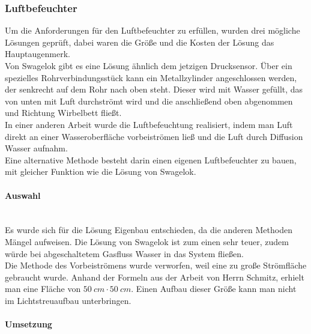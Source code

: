 \subsubsection{Luftbefeuchter}

Um die Anforderungen für den Luftbefeuchter zu erfüllen, wurden drei mögliche Lösungen geprüft, dabei waren die Größe und die Kosten der Lösung das Hauptaugenmerk. \\
Von Swagelok gibt es eine Lösung ähnlich dem jetzigen Drucksensor. Über ein spezielles Rohrverbindungsstück kann ein Metallzylinder angeschlossen werden, der senkrecht auf dem Rohr nach oben steht. Dieser wird mit Wasser gefüllt, das von unten mit Luft durchströmt wird und die anschließend oben abgenommen und Richtung Wirbelbett fließt. \\
In einer anderen Arbeit \cite{Fallturmexperiment} wurde die Luftbefeuchtung realisiert, indem man Luft direkt an einer  Wasseroberfläche vorbeiströmen ließ und die Luft durch Diffusion Wasser aufnahm. \\
Eine alternative Methode besteht darin einen eigenen Luftbefeuchter zu bauen, mit gleicher Funktion wie die Lösung von Swagelok. 


\paragraph{Auswahl}

\hfill \\

Es wurde sich für die Lösung Eigenbau entschieden, da die anderen Methoden Mängel aufweisen. Die Lösung von Swagelok ist zum einen sehr teuer, zudem würde bei abgeschaltetem Gasfluss Wasser in das System fließen. \\
Die Methode des Vorbeiströmens wurde verworfen, weil eine zu große Strömfläche gebraucht wurde. Anhand der Formeln aus der Arbeit von Herrn Schmitz, erhielt man eine Fläche von $\SI{50}{cm} \cdot \SI{50}{cm}$. Einen Aufbau dieser Größe kann man nicht im Lichtstreuaufbau unterbringen.

\paragraph{Umsetzung}

\hfill \\

